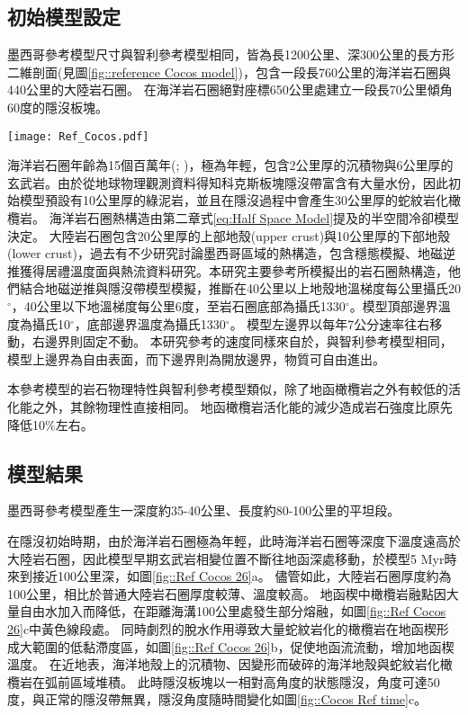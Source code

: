 \subsection{初始模型設定}
墨西哥參考模型尺寸與智利參考模型相同，皆為長1200公里、深300公里的長方形二維剖面(見圖\ref{fig::reference Cocos model})，包含一段長760公里的海洋岩石圈與440公里的大陸岩石圈。
在海洋岩石圈絕對座標650公里處建立一段長70公里傾角60度的隱沒板塊。
\begin{figure*}[ht!]
    \centering
    \texttt{[image: Ref\_Cocos.pdf]}
    \caption[墨西哥參考模型設計與邊界條件示意圖]{墨西哥參考模型設計與邊界條件示意圖}
    \label{fig::reference Cocos model}
\end{figure*}

海洋岩石圈年齡為15個百萬年(\citealp{Manea2011Thermal}; \citealp{muller2019})，極為年輕，包含2公里厚的沉積物與6公里厚的玄武岩。由於從地球物理觀測資料得知科克斯板塊隱沒帶富含有大量水份，因此初始模型預設有10公里厚的綠泥岩，並且在隱沒過程中會產生30公里厚的蛇紋岩化橄欖岩。
海洋岩石圈熱構造由第二章式\ref{eq:Half Space Model}提及的半空間冷卻模型決定。
大陸岩石圈包含20公里厚的上部地殼(upper crust)與10公里厚的下部地殼(lower crust)，過去有不少研究討論墨西哥區域的熱構造，包含穩態模擬、地磁逆推獲得居禮溫度面與熱流資料研究。本研究主要參考\citealp{Manea2011Curie}所模擬出的岩石圈熱構造，他們結合地磁逆推與隱沒帶模型模擬，推斷在40公里以上地殼地溫梯度每公里攝氏20$^{\circ}$，40公里以下地溫梯度每公里6度，至岩石圈底部為攝氏1330$^{\circ}$。模型頂部邊界溫度為攝氏10$^{\circ}$，底部邊界溫度為攝氏1330$^{\circ}$。
模型左邊界以每年7公分速率往右移動，右邊界則固定不動。
本研究參考的速度同樣來自於\citealp{o2005uncertainties}，與智利參考模型相同，模型上邊界為自由表面，而下邊界則為開放邊界，物質可自由進出。

本參考模型的岩石物理特性與智利參考模型類似，除了地函橄欖岩之外有較低的活化能之外，其餘物理性直接相同。
地函橄欖岩活化能的減少造成岩石強度比原先降低10$\%$左右。


\subsection{模型結果}\label{墨西哥參考模型結果}
墨西哥參考模型產生一深度約35-40公里、長度約80-100公里的平坦段。

在隱沒初始時期，由於海洋岩石圈極為年輕，此時海洋岩石圈等深度下溫度遠高於大陸岩石圈，因此模型早期玄武岩相變位置不斷往地函深處移動，於模型5 Myr時來到接近100公里深，如圖\ref{fig::Ref Cocos 26}a。
儘管如此，大陸岩石圈厚度約為100公里，相比於普通大陸岩石圈厚度較薄、溫度較高。
地函楔中橄欖岩融點因大量自由水加入而降低，在距離海溝100公里處發生部分熔融，如圖\ref{fig::Ref Cocos 26}c中黃色線段處。
同時劇烈的脫水作用導致大量蛇紋岩化的橄欖岩在地函楔形成大範圍的低黏滯度區，如圖\ref{fig::Ref Cocos 26}b，促使地函流流動，增加地函楔溫度。
在近地表，海洋地殼上的沉積物、因變形而破碎的海洋地殼與蛇紋岩化橄欖岩在弧前區域堆積。
此時隱沒板塊以一相對高角度的狀態隱沒，角度可達50度，與正常的隱沒帶無異，隱沒角度隨時間變化如圖\ref{fig::Cocos Ref time}c。

